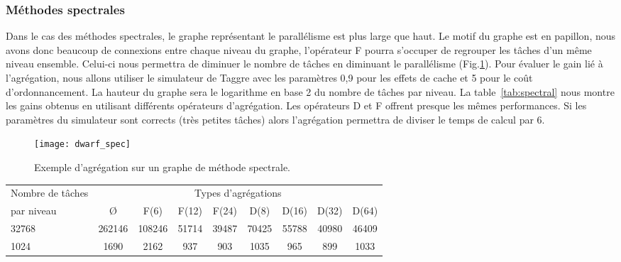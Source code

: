 \subsubsection{Méthodes spectrales}
Dans le cas des méthodes spectrales, le graphe représentant le parallélisme est plus large que haut.
%
Le motif du graphe est en papillon, nous avons donc beaucoup de connexions entre chaque niveau du graphe, l'opérateur F pourra s'occuper de regrouper les tâches d'un même niveau ensemble.
%
Celui-ci nous permettra de diminuer le nombre de tâches en diminuant le parallélisme (Fig.\ref{fig:dwarf_spec}).
%
Pour évaluer le gain lié à l'agrégation, nous allons utiliser le simulateur de Taggre avec les paramètres 0,9 pour les effets de cache et 5 pour le coût d'ordonnancement.
%
La hauteur du graphe sera le logarithme en base 2 du nombre de tâches par niveau.
%
La table~\ref{tab:spectral} nous montre les gains obtenus en utilisant différents opérateurs d'agrégation.
%
Les opérateurs D et F offrent presque les mêmes performances.
%
Si les paramètres du simulateur sont corrects (très petites tâches) alors l'agrégation permettra de diviser le temps de calcul par 6.


\begin{figure}
  \centering
  \texttt{[image: dwarf\_spec]}
  \caption{Exemple d'agrégation sur un graphe de méthode spectrale.}
  \label{fig:dwarf_spec}
\end{figure}
\begin{center}
  \begin{tabular}{|l|c|c|c|c|c|c|c|c|}
    \hline
   Nombre de tâches &  \multicolumn{8}{c|}{Types d'agrégations}\\
   par niveau & \O & F(6) & F(12) & F(24) & D(8) & D(16) & D(32) & D(64) \\
    \hline
   32768 & 262146 & 108246 & 51714 & 39487 & 70425 & 55788 & 40980 & 46409 \\
   1024  & 1690   & 2162   & 937   & 903   & 1035  & 965   & 899   & 1033 \\
    \hline
  \end{tabular}
  \label{tab:spectral}
\end{center}

